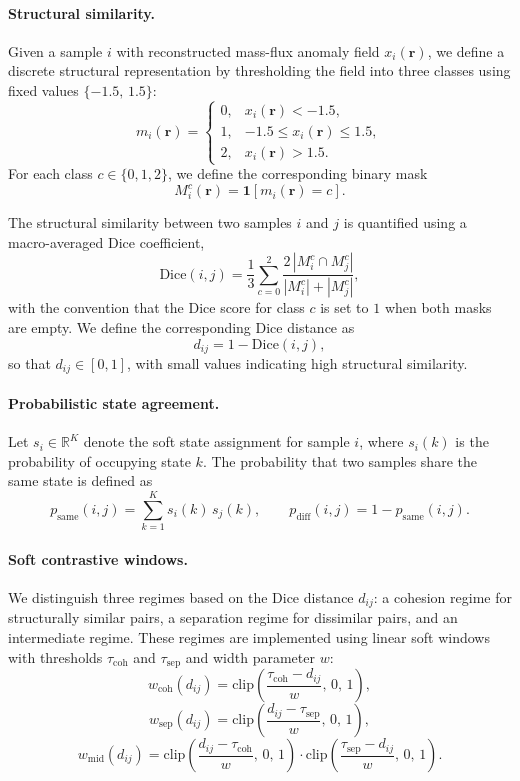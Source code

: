 \documentclass[11pt]{article}
\begin{document}
\paragraph{Structural similarity.}
Given a sample $i$ with reconstructed mass-flux anomaly field $x_i(\mathbf{r})$, we define a discrete structural representation by thresholding the field into three classes using fixed values $\{-1.5,\,1.5\}$:
\[
m_i(\mathbf{r}) =
\begin{cases}
0, & x_i(\mathbf{r}) < -1.5, \\
1, & -1.5 \le x_i(\mathbf{r}) \le 1.5, \\
2, & x_i(\mathbf{r}) > 1.5.
\end{cases}
\]
For each class $c \in \{0,1,2\}$, we define the corresponding binary mask
\[
M_i^c(\mathbf{r}) = \mathbf{1}\!\left[m_i(\mathbf{r}) = c\right].
\]

The structural similarity between two samples $i$ and $j$ is quantified using a macro-averaged Dice coefficient,
\[
\mathrm{Dice}(i,j)
=
\frac{1}{3}
\sum_{c=0}^{2}
\frac{2\,|M_i^c \cap M_j^c|}{|M_i^c| + |M_j^c|},
\]
with the convention that the Dice score for class $c$ is set to $1$ when both masks are empty. We define the corresponding Dice distance as
\[
d_{ij} = 1 - \mathrm{Dice}(i,j),
\]
so that $d_{ij} \in [0,1]$, with small values indicating high structural similarity.

\paragraph{Probabilistic state agreement.}
Let $s_i \in \mathbb{R}^K$ denote the soft state assignment for sample $i$, where $s_i(k)$ is the probability of occupying state $k$. The probability that two samples share the same state is defined as
\[
p_{\mathrm{same}}(i,j) = \sum_{k=1}^K s_i(k)\, s_j(k),
\qquad
p_{\mathrm{diff}}(i,j) = 1 - p_{\mathrm{same}}(i,j).
\]

\paragraph{Soft contrastive windows.}
We distinguish three regimes based on the Dice distance $d_{ij}$: a cohesion regime for structurally similar pairs, a separation regime for dissimilar pairs, and an intermediate regime. These regimes are implemented using linear soft windows with thresholds $\tau_{\mathrm{coh}}$ and $\tau_{\mathrm{sep}}$ and width parameter $w$:
\[
w_{\mathrm{coh}}(d_{ij}) =
\mathrm{clip}\!\left(\frac{\tau_{\mathrm{coh}} - d_{ij}}{w},\,0,\,1\right),
\]
\[
w_{\mathrm{sep}}(d_{ij}) =
\mathrm{clip}\!\left(\frac{d_{ij} - \tau_{\mathrm{sep}}}{w},\,0,\,1\right),
\]
\[
w_{\mathrm{mid}}(d_{ij}) =
\mathrm{clip}\!\left(\frac{d_{ij} - \tau_{\mathrm{coh}}}{w},\,0,\,1\right)
\cdot
\mathrm{clip}\!\left(\frac{\tau_{\mathrm{sep}} - d_{ij}}{w},\,0,\,1\right).
\]
\end{document}

